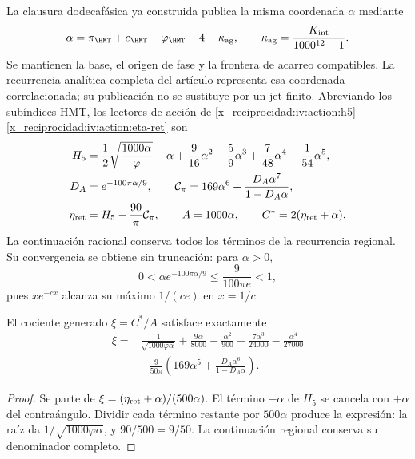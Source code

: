 La clausura dodecafásica ya construida publica la misma coordenada \(\alpha\) mediante
\[
 \alpha=\pi_{\HMT}+e_{\HMT}-\varphi_{\HMT}-4-\kappa_{\rm ag},
 \qquad \kappa_{\rm ag}=\frac{K_{\rm int}}{1000^{12}-1}.
\]
Se mantienen la base, el origen de fase y la frontera de acarreo compatibles. La recurrencia analítica completa del artículo representa esa coordenada correlacionada; su publicación no se sustituye por un jet finito. Abreviando los subíndices HMT, los lectores de acción de \eqref{x_reciprocidad:iv:action:h5}--\eqref{x_reciprocidad:iv:action:eta-ret} son
\begin{align}
 H_5&=\frac12\sqrt{\frac{1000\alpha}{\varphi}}-\alpha
       +\frac9{16}\alpha^2-\frac59\alpha^3
       +\frac7{48}\alpha^4-\frac1{54}\alpha^5,\nonumber\\
 D_A&=e^{-100\pi\alpha/9},\qquad
 \mathcal C_\pi=169\alpha^6+\frac{D_A\alpha^7}{1-D_A\alpha},\nonumber\\
 \eta_{\rm ret}&=H_5-\frac{90}{\pi}\mathcal C_\pi,
 \qquad A=1000\alpha,\qquad C^*=2(\eta_{\rm ret}+\alpha).
 \label{x_reciprocidad:rec:eq:lectores-completos}
\end{align}
La continuación racional conserva todos los términos de la recurrencia regional. Su convergencia se obtiene sin truncación: para \(\alpha>0\),
\[
 0<\alpha e^{-100\pi\alpha/9}\le\frac9{100\pi e}<1,
\]
pues \(xe^{-cx}\) alcanza su máximo \(1/(ce)\) en \(x=1/c\).

\begin{proposition}
\label{x_reciprocidad:rec:prop:sustitucion}
El cociente generado \(\xi=C^*/A\) satisface exactamente
\begin{align}
 \xi={}&\frac1{\sqrt{1000\varphi\alpha}}
 +\frac{9\alpha}{8000}-\frac{\alpha^2}{900}
 +\frac{7\alpha^3}{24000}-\frac{\alpha^4}{27000}\nonumber\\
 &-\frac9{50\pi}
 \left(169\alpha^5+\frac{D_A\alpha^6}{1-D_A\alpha}\right).
 \label{x_reciprocidad:rec:eq:xi-completa}
\end{align}
\end{proposition}
\begin{proof}
Se parte de \(\xi=(\eta_{\rm ret}+\alpha)/(500\alpha)\). El término \(-\alpha\) de \(H_5\) se cancela con \(+\alpha\) del contraángulo. Dividir cada término restante por \(500\alpha\) produce la expresión: la raíz da \(1/\sqrt{1000\varphi\alpha}\), y \(90/500=9/50\). La continuación regional conserva su denominador completo.
\end{proof}


